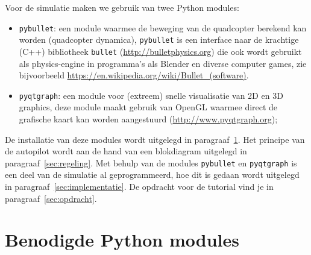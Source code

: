 \documentclass[a4paper,11pt]{article}
\begin{document}
Voor de simulatie maken we gebruik van twee Python modules:
\begin{itemize}
  \item \texttt{pybullet}: een module waarmee de beweging van de quadcopter
    berekend kan worden (quadcopter dynamica), \texttt{pybullet} is een
    interface naar de krachtige (C++) bibliotheek \texttt{bullet}
    (\url{http://bulletphysics.org}) die ook wordt gebruikt als physics-engine
    in programma's als Blender en diverse computer games, zie bijvoorbeeld
    \url{https://en.wikipedia.org/wiki/Bullet_(software)}. 
  \item \texttt{pyqtgraph}: een module voor (extreem) snelle visualisatie van 2D
    en 3D graphics, deze module maakt gebruik van OpenGL waarmee direct de
    grafische kaart kan worden aangestuurd (\url{http://www.pyqtgraph.org});
\end{itemize}
De installatie van deze modules wordt uitgelegd in
paragraaf~\ref{sec:install}. Het principe van de autopilot wordt aan de hand
van een blokdiagram uitgelegd in paragraaf~\ref{sec:regeling}. 
Met behulp van de modules \texttt{pybullet} en \texttt{pyqtgraph} is een deel van de simulatie al
geprogrammeerd, hoe dit is gedaan wordt uitgelegd in
paragraaf~\ref{sec:implementatie}.
De opdracht voor de tutorial vind je in paragraaf~\ref{sec:opdracht}.

\section{Benodigde Python modules}
\label{sec:install}
\end{document}
